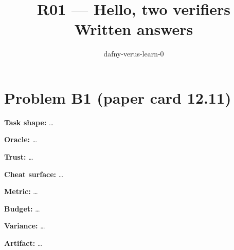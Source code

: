 \documentclass[11pt]{article}
\title{R01 --- Hello, two verifiers \\ \large Written answers}
\author{dafny-verus-learn-0}
\date{}
\begin{document}
\maketitle
\section*{Problem B1 (paper card 12.11)}\label{ans:B1}
\begin{answer}
\textbf{Task shape:} \dots

\textbf{Oracle:} \dots

\textbf{Trust:} \dots

\textbf{Cheat surface:} \dots

\textbf{Metric:} \dots

\textbf{Budget:} \dots

\textbf{Variance:} \dots

\textbf{Artifact:} \dots
\end{answer}
\end{document}
